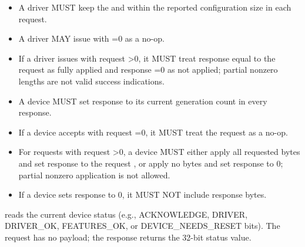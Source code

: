 \begin{itemize}
  \item A driver MUST keep the  and  within the
        reported
        configuration size in each  request.
  \item A driver MAY issue  with =0 as a
        no-op.
  \item If a driver issues  with request >0,
        it MUST treat response  equal to the request
         as fully applied and response =0 as not
        applied; partial nonzero lengths are not valid success indications.
\end{itemize}

\begin{itemize}
  \item A device MUST set response  to its current generation
        count in every  response.
  \item If a device accepts  with request =0,
        it MUST treat the request as a no-op.
  \item For  requests with request >0, a
        device MUST either apply all requested bytes and set response
         to the request , or apply no bytes and set
        response  to 0; partial nonzero application is not
        allowed.
  \item If a device sets response  to 0, it MUST NOT include
        response  bytes.
\end{itemize}


 reads the current device status (e.g., ACKNOWLEDGE,
DRIVER, DRIVER\_OK, FEATURES\_OK, or DEVICE\_NEEDS\_RESET bits). The request has
no payload; the response returns the 32-bit status value.

